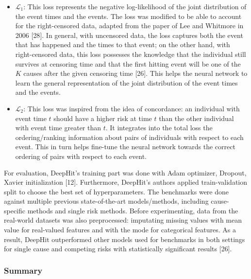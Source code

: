 \documentclass[
]{article}
\providecommand{\tightlist}{%
  \setlength{\itemsep}{0pt}\setlength{\parskip}{0pt}}
\begin{document}
\begin{itemize}
\tightlist
\item
  \(\mathcal{L}_1\): This loss represents the negative log-likelihood of the joint distribution of the event times and the events. The loss was modified to be able to account for the right-censored data, adapted from the paper of Lee and Whitmore in 2006 {[}28{]}. In general, with uncensored data, the loss captures both the event that has happened and the times to that event; on the other hand, with right-censored data, this loss possesses the knowledge that the individual still survives at censoring time and that the first hitting event will be one of the \(K\) causes after the given censoring time {[}26{]}. This helps the neural network to learn the general representation of the joint distribution of the event times and the events.
\item
  \(\mathcal{L}_2\): This loss was inspired from the idea of concordance: an individual with event time \(t\) should have a higher risk at time \(t\) than the other individual with event time greater than \(t\). It integrates into the total loss the ordering/ranking information about pairs of individuals with respect to each event. This in turn helps fine-tune the neural network towards the correct ordering of pairs with respect to each event.
\end{itemize}

For evaluation, DeepHit's training part was done with Adam optimizer, Dropout, Xavier initialization {[}12{]}. Furthermore, DeepHit's authors applied train-validation split to choose the best set of hyperparameters. The benchmarks were done against multiple previous state-of-the-art models/methods, including cause-specific methods and single risk methods. Before experimenting, data from the real-world datasets was also preprocessed: imputating missing values with mean value for real-valued features and with the mode for categorical features. As a result, DeepHit outperformed other models used for benchmarks in both settings for single cause and competing risks with statistically significant results {[}26{]}.

\hypertarget{summary}{%
\subsubsection{Summary}\label{summary}}
\end{document}
